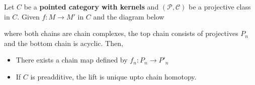 \documentclass{article}
\begin{document}
\begin{theorem}
    Let $C$ be a \textbf{pointed category with kernels} and $(\mathcal{P}, \mathcal{C})$ be a projective class in $C$. Given $f: M \to M'$ in $C$ and the diagram below
    \begin{center}
    \end{center}

    where both chains are chain complexes, the top chain consists of projectives $P_n$ and the bottom chain is acyclic. Then,
    \begin{itemize}
        \item There exists a chain map defined by $f_n: P_n \to P'_n$
        \item If $C$ is preadditive, the lift is unique upto chain homotopy.
    \end{itemize}
\end{theorem}
\end{document}
